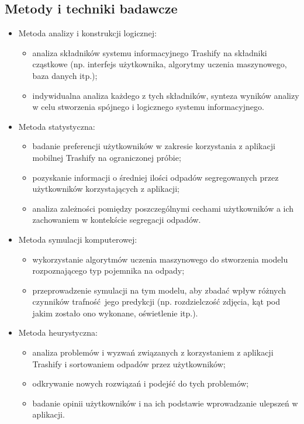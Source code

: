 \documentclass[12pt, a4paper, twoside, openany]{book}
\begin{document}
\subsection{Metody i techniki badawcze}
\begin{itemize}
    \item Metoda analizy i konstrukcji logicznej:
          \begin{itemize}
              \item analiza składników systemu informacyjnego Trashify na składniki cząstkowe (np. interfejs użytkownika, algorytmy uczenia maszynowego, baza danych itp.);
              \item indywidualna analiza każdego z tych składników,
                    synteza wyników analizy w celu stworzenia spójnego i logicznego systemu informacyjnego.
          \end{itemize}
    \item Metoda statystyczna:
          \begin{itemize}
              \item badanie preferencji użytkowników w zakresie korzystania z aplikacji mobilnej Trashify na ograniczonej próbie;
              \item pozyskanie informacji o średniej ilości odpadów segregowanych przez użytkowników korzystających z aplikacji;
              \item analiza zależności pomiędzy poszczególnymi cechami użytkowników a ich zachowaniem w kontekście segregacji odpadów.
          \end{itemize}
    \item Metoda symulacji komputerowej:
          \begin{itemize}
              \item wykorzystanie algorytmów uczenia maszynowego do stworzenia modelu rozpoznającego typ pojemnika na odpady;
              \item przeprowadzenie symulacji na tym modelu, aby zbadać wpływ różnych czynników trafność jego predykcji (np. rozdzielczość zdjęcia, kąt pod jakim zostało ono wykonane, oświetlenie itp.).
          \end{itemize}
    \item Metoda heurystyczna:
          \begin{itemize}
              \item analiza problemów i wyzwań związanych z korzystaniem z aplikacji Trashify i sortowaniem odpadów przez użytkowników;
              \item odkrywanie nowych rozwiązań i podejść do tych problemów;
              \item badanie opinii użytkowników i na ich podstawie wprowadzanie ulepszeń w aplikacji.
          \end{itemize}
\end{itemize}
\end{document}
